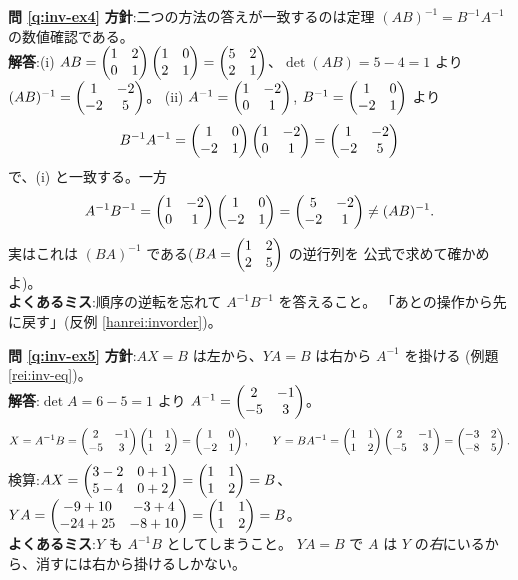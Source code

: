 \bigskip
\noindent\textbf{問 \ref{q:inv-ex4}}\quad
\textbf{方針}:二つの方法の答えが一致するのは定理
$(AB)^{-1} = B^{-1}A^{-1}$ の数値確認である。\\
\textbf{解答}:(i) $AB = \begin{pmatrix}1 & 2 \\ 0 & 1\end{pmatrix}\begin{pmatrix}1 & 0 \\ 2 & 1\end{pmatrix}
= \begin{pmatrix}5 & 2 \\ 2 & 1\end{pmatrix}$、$\det(AB) = 5 - 4 = 1$ より
$(AB)^{-1} = \begin{pmatrix}1 & -2 \\ -2 & 5\end{pmatrix}$。
(ii) $A^{-1} = \begin{pmatrix}1 & -2 \\ 0 & 1\end{pmatrix}$, $B^{-1} = \begin{pmatrix}1 & 0 \\ -2 & 1\end{pmatrix}$ より
\[
B^{-1}A^{-1} = \begin{pmatrix}1 & 0 \\ -2 & 1\end{pmatrix}\begin{pmatrix}1 & -2 \\ 0 & 1\end{pmatrix}
= \begin{pmatrix}1 & -2 \\ -2 & 5\end{pmatrix}
\]
で、(i) と一致する。一方
\[
A^{-1}B^{-1} = \begin{pmatrix}1 & -2 \\ 0 & 1\end{pmatrix}\begin{pmatrix}1 & 0 \\ -2 & 1\end{pmatrix}
= \begin{pmatrix}5 & -2 \\ -2 & 1\end{pmatrix} \neq (AB)^{-1}.
\]
実はこれは $(BA)^{-1}$ である($BA = \begin{pmatrix}1 & 2 \\ 2 & 5\end{pmatrix}$ の逆行列を
公式で求めて確かめよ)。\\
\textbf{よくあるミス}:順序の逆転を忘れて $A^{-1}B^{-1}$ を答えること。
「あとの操作から先に戻す」(反例 \ref{hanrei:invorder})。

\bigskip
\noindent\textbf{問 \ref{q:inv-ex5}}\quad
\textbf{方針}:$AX = B$ は左から、$YA = B$ は右から $A^{-1}$ を掛ける
(例題 \ref{rei:inv-eq})。\\
\textbf{解答}:$\det A = 6 - 5 = 1$ より
$A^{-1} = \begin{pmatrix}2 & -1 \\ -5 & 3\end{pmatrix}$。
\[
X = A^{-1}B = \begin{pmatrix}2 & -1 \\ -5 & 3\end{pmatrix}\begin{pmatrix}1 & 1 \\ 1 & 2\end{pmatrix}
= \begin{pmatrix}1 & 0 \\ -2 & 1\end{pmatrix},
\qquad
Y = BA^{-1} = \begin{pmatrix}1 & 1 \\ 1 & 2\end{pmatrix}\begin{pmatrix}2 & -1 \\ -5 & 3\end{pmatrix}
= \begin{pmatrix}-3 & 2 \\ -8 & 5\end{pmatrix}.
\]
検算:$AX = \begin{pmatrix}3 - 2 & 0 + 1 \\ 5 - 4 & 0 + 2\end{pmatrix} = \begin{pmatrix}1 & 1 \\ 1 & 2\end{pmatrix} = B$、
$YA = \begin{pmatrix}-9 + 10 & -3 + 4 \\ -24 + 25 & -8 + 10\end{pmatrix} = \begin{pmatrix}1 & 1 \\ 1 & 2\end{pmatrix} = B$。\\
\textbf{よくあるミス}:$Y$ も $A^{-1}B$ としてしまうこと。
$YA = B$ で $A$ は $Y$ の\emph{右}にいるから、消すには右から掛けるしかない。

